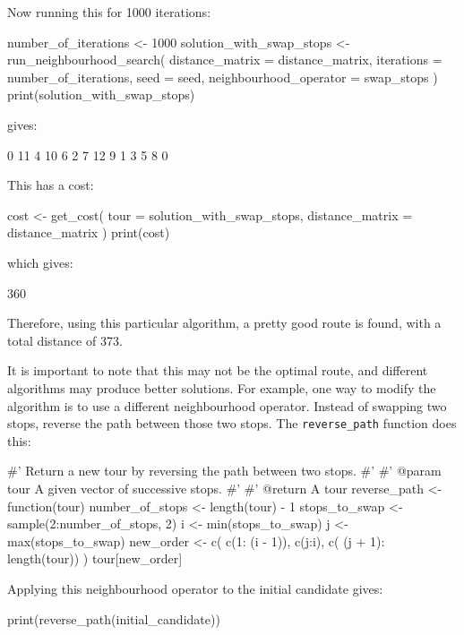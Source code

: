 Now running this for 1000 iterations:

\begin{Rin}
number_of_iterations <- 1000
solution_with_swap_stops <- run_neighbourhood_search(
    distance_matrix = distance_matrix,
    iterations = number_of_iterations,
    seed = seed,
    neighbourhood_operator = swap_stops
)
print(solution_with_swap_stops)
\end{Rin}

gives:

\begin{Rout}
 [1]  0 11  4 10  6  2  7 12  9  1  3  5  8  0
\end{Rout}

This has a cost:

\begin{Rin}
cost <- get_cost(
    tour = solution_with_swap_stops,
    distance_matrix = distance_matrix
)
print(cost)
\end{Rin}

which gives:

\begin{Rout}
[1] 360
\end{Rout}

Therefore, using this particular algorithm, a pretty good route is found, with a
total distance of 373.

It is important to note that this may not be the optimal route, and different algorithms
 may produce better solutions.
For example, one way to modify the algorithm is to use a different neighbourhood operator.
Instead of swapping two stops, reverse the path between those two
stops. The \texttt{reverse_path} function does this:


\begin{Rin}
#' Return a new tour by reversing the path between two stops.
#'
#' @param tour A given vector of successive stops.
#'
#' @return A tour
reverse_path <- function(tour){
    number_of_stops <- length(tour) - 1
    stops_to_swap <- sample(2:number_of_stops, 2)
    i <- min(stops_to_swap)
    j <- max(stops_to_swap)
    new_order <- c(
            c(1: (i - 1)),
            c(j:i),
            c( (j + 1): length(tour))
            )
    tour[new_order]
    }
\end{Rin}

Applying this neighbourhood operator to the initial candidate gives:

\begin{Rin}
print(reverse_path(initial_candidate))
\end{Rin}

